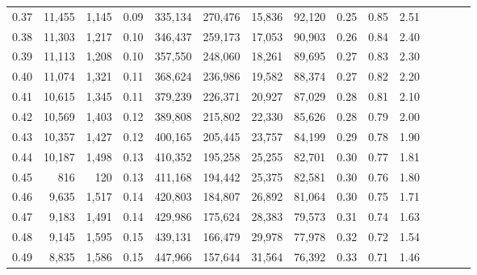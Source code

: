 \begin{tabular}{rrrcrrrrrrrrrrr}
0.37 &  11,455 &  1,145 &                                       0.09 &  335,134 &  270,476 &   15,836 &   92,120 &  0.25 &  0.85 &                         2.51 \\
0.38 &  11,303 &  1,217 &                                       0.10 &  346,437 &  259,173 &   17,053 &   90,903 &  0.26 &  0.84 &                         2.40 \\
0.39 &  11,113 &  1,208 &                                       0.10 &  357,550 &  248,060 &   18,261 &   89,695 &  0.27 &  0.83 &                         2.30 \\
0.40 &  11,074 &  1,321 &                                       0.11 &  368,624 &  236,986 &   19,582 &   88,374 &  0.27 &  0.82 &                         2.20 \\
0.41 &  10,615 &  1,345 &                                       0.11 &  379,239 &  226,371 &   20,927 &   87,029 &  0.28 &  0.81 &                         2.10 \\
0.42 &  10,569 &  1,403 &                                       0.12 &  389,808 &  215,802 &   22,330 &   85,626 &  0.28 &  0.79 &                         2.00 \\
0.43 &  10,357 &  1,427 &                                       0.12 &  400,165 &  205,445 &   23,757 &   84,199 &  0.29 &  0.78 &                         1.90 \\
0.44 &  10,187 &  1,498 &                                       0.13 &  410,352 &  195,258 &   25,255 &   82,701 &  0.30 &  0.77 &                         1.81 \\
0.45 &     816 &    120 &                                       0.13 &  411,168 &  194,442 &   25,375 &   82,581 &  0.30 &  0.76 &                         1.80 \\
0.46 &   9,635 &  1,517 &                                       0.14 &  420,803 &  184,807 &   26,892 &   81,064 &  0.30 &  0.75 &                         1.71 \\
0.47 &   9,183 &  1,491 &                                       0.14 &  429,986 &  175,624 &   28,383 &   79,573 &  0.31 &  0.74 &                         1.63 \\
0.48 &   9,145 &  1,595 &                                       0.15 &  439,131 &  166,479 &   29,978 &   77,978 &  0.32 &  0.72 &                         1.54 \\
0.49 &   8,835 &  1,586 &                                       0.15 &  447,966 &  157,644 &   31,564 &   76,392 &  0.33 &  0.71 &                         1.46 \\

\end{tabular}
